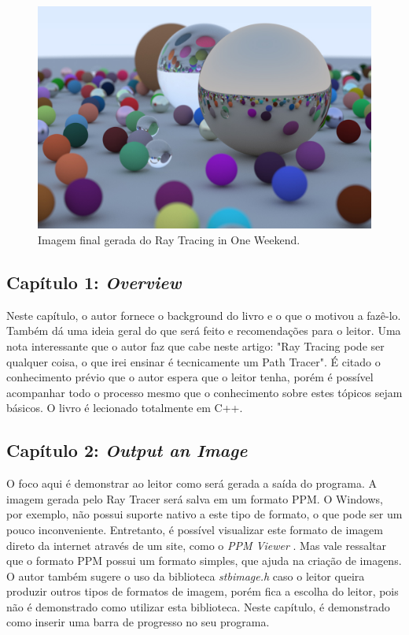 \documentclass[journal]{IEEEtran}
\begin{document}
\begin{figure}[ht]
  \centering
  \includegraphics[width=\linewidth]{media/rtiow-final.jpg}
  \caption{Imagem final gerada do Ray Tracing in One Weekend.}
  \label{img_rtiow_final}
\end{figure}

\subsection*{Capítulo 1: \emph{Overview}}
Neste capítulo, o autor fornece o background do livro e o que o motivou a fazê-lo. 
Também dá uma ideia geral do que será feito e recomendações para o leitor. Uma nota
interessante que o autor faz que cabe neste artigo: "Ray Tracing pode ser qualquer coisa,
o que irei ensinar é tecnicamente um Path Tracer". É citado o conhecimento prévio que o
autor espera que o leitor tenha, porém é possível acompanhar todo o processo mesmo que
o conhecimento sobre estes tópicos sejam básicos. O livro é lecionado totalmente em C++.

\subsection*{Capítulo 2: \emph{Output an Image}}
O foco aqui é demonstrar ao leitor como será gerada a saída do programa. A imagem gerada
pelo Ray Tracer será salva em um formato PPM. O Windows, por exemplo, não possui suporte
nativo a este tipo de formato, o que pode ser um pouco inconveniente. Entretanto, é possível
visualizar este formato de imagem direto da internet através de um site, como o \emph{PPM Viewer}
\cite{PPMviewer}. Mas vale ressaltar que o formato PPM possui um formato simples, que ajuda
na criação de imagens. O autor também sugere o uso da biblioteca \emph{stb\textunderscore image.h}
\cite{stb-rep} caso o leitor queira produzir outros tipos de formatos de imagem, porém fica a
escolha do leitor, pois não é demonstrado como utilizar esta biblioteca. Neste capítulo, é
demonstrado como inserir uma barra de progresso no seu programa.
\end{document}
